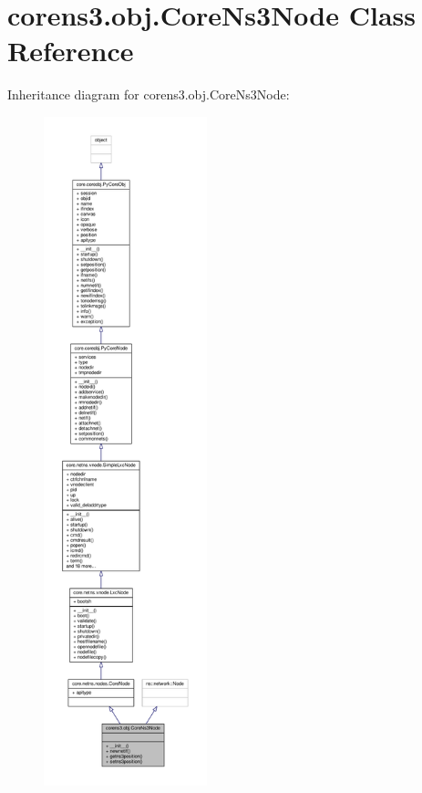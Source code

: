 \hypertarget{classcorens3_1_1obj_1_1_core_ns3_node}{\section{corens3.\+obj.\+Core\+Ns3\+Node Class Reference}
\label{classcorens3_1_1obj_1_1_core_ns3_node}
}


Inheritance diagram for corens3.\+obj.\+Core\+Ns3\+Node\+:
\nopagebreak
\begin{figure}[H]
\begin{center}
\leavevmode
\includegraphics[height=550pt]{classcorens3_1_1obj_1_1_core_ns3_node__inherit__graph}
\end{center}
\end{figure}


